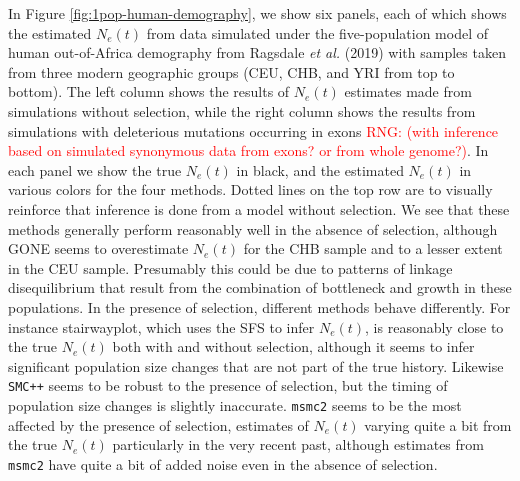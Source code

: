 \documentclass[hidelinks]{article}
\newcommand{\msmc}{\texttt{msmc2}\xspace}
\newcommand{\smcpp}{\texttt{SMC++}\xspace}
\newcommand{\rngcomment}[1]{\textcolor{red}{RNG: #1}}
\begin{document}
    In Figure \ref{fig:1pop-human-demography}, we show six panels, each of which shows the estimated $N_e(t)$
    from data simulated under the five-population model of human out-of-Africa demography
    from Ragsdale \textit{et al.} (2019)
    with samples taken from three modern geographic groups (CEU, CHB, and YRI from top to bottom).
    The left column shows the results of $N_e(t)$ estimates made from simulations without selection, 
    while the right column shows the results
    from simulations with deleterious mutations occurring in exons \rngcomment{(with inference based on simulated synonymous data from exons? or from whole genome?)}.
    In each panel we show the true $N_e(t)$ in black, and the estimated $N_e(t)$
    in various colors for the four methods. Dotted lines on the top row are to visually reinforce that inference is done
    from a model without selection. We see that these methods generally perform reasonably well in the absence of selection, 
    although GONE seems to overestimate $N_e(t)$ for the CHB sample and to a lesser extent in the CEU sample.
    Presumably this could be due to patterns of linkage disequilibrium that result from the combination
    of bottleneck and growth in these populations.
    In the presence of selection, different methods behave differently. 
    For instance stairwayplot, which uses the SFS to infer $N_e(t)$, 
    is reasonably close to the true $N_e(t)$ both with and without selection,
    although it seems to infer significant population size changes that are not part of the true history.
    Likewise \smcpp seems to be robust to the presence of selection,
    but the timing of population size changes is slightly inaccurate. 
    \msmc seems to be the most affected by the presence of selection, 
    estimates of $N_e(t)$ varying quite a bit from the true $N_e(t)$ particularly in the very recent past,
    although estimates from \msmc have quite a bit of added noise even in the absence of selection.

\end{document}

